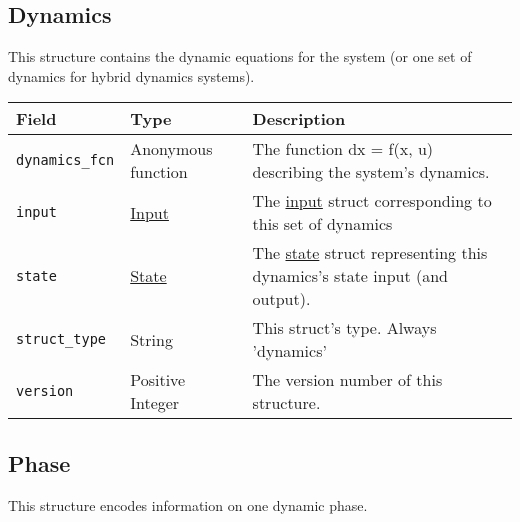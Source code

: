 \documentclass{article}
\begin{document}
		\subsection{Dynamics}
			\label{sec:dynamics} %

			This structure contains the dynamic equations for the system (or one set of dynamics for hybrid dynamics systems).

			\vspace{\baselineskip}

			\begin{tabular}{ p{} | p{} | p{}}
				Field                    & Type                               & Description                                      \\ \hline
				\lstinline|dynamics_fcn| & \raggedright Anonymous function    & The function dx = f(x, u) describing the system's
				                                                                dynamics.                                        \\[1ex]
				\lstinline|input|        & \hyperref[sec:input]{Input}        & The \hyperref[sec:input]{input} struct corresponding
				                                                                to this set of dynamics                          \\[1ex]
				\lstinline|state|        & \hyperref[sec:state]{State}        & The \hyperref[sec:state]{state} struct representing
				                                                                this dynamics's state input (and output).        \\[1ex]
				\lstinline|struct_type|  & String                             & This struct's type. Always 'dynamics'            \\[1ex]
				\lstinline|version|      & \raggedright Positive Integer      & The version number of this structure.
			\end{tabular}

		\subsection{Phase}
			\label{sec:phase} %

			This structure encodes information on one dynamic phase.

			\vspace{\baselineskip}
\end{document}
